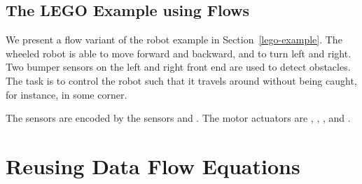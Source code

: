 \subsection{The LEGO Example using Flows}

We present a flow variant of the robot example in
Section~\ref{lego-example}.  The wheeled robot is able to move
forward and backward, and to turn left and right.  Two bumper sensors
on the left and right front end are used to detect obstacles.  The
task is to control the robot such that it travels around without
being caught, for instance, in some corner.


The sensors are encoded by the sensors 
and . The motor actuators are , , 
, and .

\section{Reusing Data Flow Equations}

